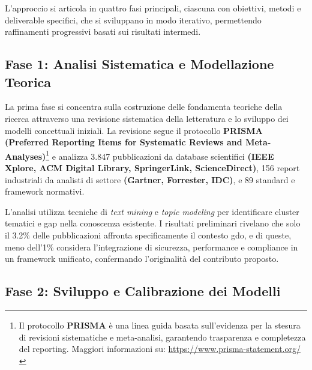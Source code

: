 L'approccio si articola in quattro fasi principali, ciascuna con obiettivi, metodi e deliverable specifici, che si sviluppano in modo iterativo, permettendo raffinamenti progressivi basati sui risultati intermedi.

\subsection{Fase 1: Analisi Sistematica e Modellazione Teorica}

\label{ssec:fase1}
La prima fase si concentra sulla costruzione delle fondamenta teoriche della ricerca attraverso una revisione sistematica della letteratura e lo sviluppo dei modelli concettuali iniziali. La revisione segue il protocollo \textbf{PRISMA (Preferred Reporting Items for Systematic Reviews and Meta-Analyses)}\footnote{Il protocollo \textbf{PRISMA} è una linea guida basata sull'evidenza per la stesura di revisioni sistematiche e meta-analisi, garantendo trasparenza e completezza del reporting. Maggiori informazioni su: \url{https://www.prisma-statement.org/}} e analizza 3.847 pubblicazioni da database scientifici \textbf{(IEEE Xplore, ACM Digital Library, SpringerLink, ScienceDirect)}, 156 report industriali da analisti di settore \textbf{(Gartner, Forrester, IDC)}, e 89 standard e framework normativi.

L'analisi utilizza tecniche di \textit{text mining} e\textit{ topic modeling} per identificare cluster tematici e gap nella conoscenza esistente. I risultati preliminari rivelano che solo il 3.2\% delle pubblicazioni affronta specificamente il contesto \gls{gdo}, e di queste, meno dell'1\% considera l'integrazione di sicurezza, performance e compliance in un framework unificato, confermando l'originalità del contributo proposto.

\subsection{Fase 2: Sviluppo e Calibrazione dei Modelli}

